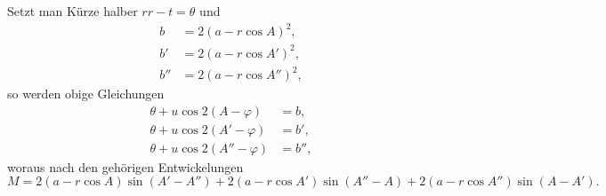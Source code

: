 \documentclass[fontsize=10pt,paper=a5,pagesize,headings=small,headinclude=true,footinclude=true]{scrbook}
\begin{document}
Setzt man Kürze halber $rr - t = \theta$ und
\begin{align*}
b &= 2(a - r\cos A)^2,\\
b' &= 2(a - r\cos A')^2,\\
b'' &= 2(a - r\cos A'')^2,
\end{align*}
so werden obige Gleichungen
\begin{align*}
\theta + u\cos 2(A - \varphi) &= b,\\
\theta + u\cos 2(A' - \varphi) &= b',\\
\theta + u\cos 2(A'' - \varphi) &= b'',
\end{align*}
woraus nach den gehörigen Entwickelungen
\[
M = 2(a - r\cos A)\sin(A' - A'')
  + 2(a - r\cos A')\sin(A'' - A)
  + 2(a - r\cos A'')\sin(A - A').
\]
\end{document}
